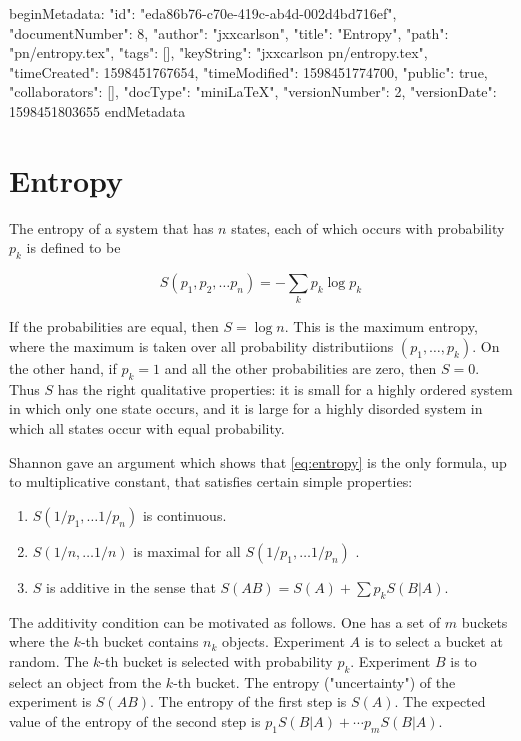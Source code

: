beginMetadata:
{
    "id": "eda86b76-c70e-419c-ab4d-002d4bd716ef",
    "documentNumber": 8,
    "author": "jxxcarlson",
    "title": "Entropy",
    "path": "pn/entropy.tex",
    "tags": [],
    "keyString": "jxxcarlson pn/entropy.tex",
    "timeCreated": 1598451767654,
    "timeModified": 1598451774700,
    "public": true,
    "collaborators": [],
    "docType": "miniLaTeX",
    "versionNumber": 2,
    "versionDate": 1598451803655
}
endMetadata

\setcounter{section}{2}

\section{Entropy}

The entropy of a system that has $n$ states, each of which occurs with probability $p_k$ is defined to be

\begin{equation}
\label{eq:entropy}
S(p_1, p_2, \ldots p_n) = - \sum_k p_k \log p_k
\end{equation}

If the probabilities are equal, then $S = \log n$.  This is the maximum entropy, where the maximum is taken over all probability distributiions $(p_1, \ldots , p_k)$.  On the other hand, if $p_k  = 1$ and all the other probabilities are zero, then $S = 0$.  Thus $S$ has the right qualitative properties: it is small for a highly ordered system in which only one state occurs, and it is large for a highly disorded system in which all states occur with equal probability.

Shannon gave an argument which shows that \eqref{eq:entropy} is the
only formula, up to multiplicative constant, that satisfies certain simple properties:

\begin{enumerate}


\item $S(1/p_1, \ldots 1/p_n)$  is continuous.

\item $S(1/n, \ldots 1/n) $ is maximal for all $S(1/p_1, \ldots 1/p_n)$ .

\item $S$ is additive in the sense that
$S(AB) = S(A) + \sum p_kS(B|A)$.

\end{enumerate}

The additivity condition can be motivated as follows. One has a set of $m$ buckets where the $k$-th bucket contains $n_k$ objects.  Experiment $A$ is to select a bucket at random.  The $k$-th bucket is selected with probability $p_k$.  Experiment $B$ is to select an object from the $k$-th bucket. The entropy ("uncertainty") of the experiment is $S(AB)$.  The entropy of the first step is $S(A)$.  The expected value of the entropy of the second step is $p_1S(B|A) + \cdots p_mS(B|A)$.


